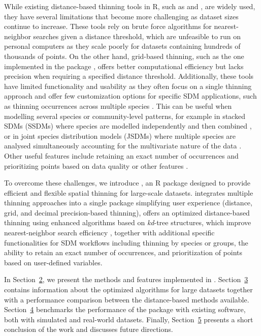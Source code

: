 While existing distance-based thinning tools in R, such as  \citep{aiello2015spthin} and  \citep{smith2023including}, are widely used, they have several limitations that become more challenging as dataset sizes continue to increase. These tools rely on brute force algorithms for nearest-neighbor searches given a distance threshold, which are unfeasible to run on personal computers as they scale poorly for datasets containing hundreds of thousands of points. On the other hand, grid-based thinning, such as the one implemented in the  package \citep{dismoRpackage}, offers better computational efficiency but lacks precision when requiring a specified distance threshold. Additionally, these tools have limited functionality and usability as they often focus on a single thinning approach and offer few customization options for specific SDM applications, such as thinning occurrences across multiple species \citep{noori2024window}. This can be useful when modelling several species or community-level patterns, for example in stacked SDMs (SSDMs) where species are modelled independently and then combined \citep{calabrese2014stacking}, or in joint species distribution models (JSDMs) where multiple species are analysed simultaneously accounting for the multivariate nature of the data \citep{pollock2014understanding, ovaskainen2017make, ovaskainen2020joint}. Other useful features include retaining an exact number of occurrences \citep{steen2021spatial} and prioritizing points based on data quality or other features \citep{yu2023future}.

To overcome these challenges, we introduce  \citep{geothinner2025}, an R package designed to provide efficient and flexible spatial thinning for large-scale datasets.  integrates multiple thinning approaches into a single package simplifying user experience (distance, grid, and decimal precision-based thinning), offers an optimized distance-based thinning using enhanced algorithms based on \emph{kd}-tree structures, which improve nearest-neighbor search efficiency \citep{friedman1975algorithm}, together with additional specific functionalities for SDM workflows including thinning by species or groups, the ability to retain an exact number of occurrences, and prioritization of points based on user-defined variables.

In Section~\hyperref[packagedescription]{2}, we present the methods and features implemented in . Section~\hyperref[modifiedthinning]{3} contains information about the optimized algorithms for large datasets together with a performance comparison between the distance-based methods available. Section~\hyperref[performancethinning]{4} benchmarks the performance of the package with existing software, both with simulated and real-world datasets. Finally, Section~\hyperref[conclusions]{5} presents a short conclusion of the work and discusses future directions.

